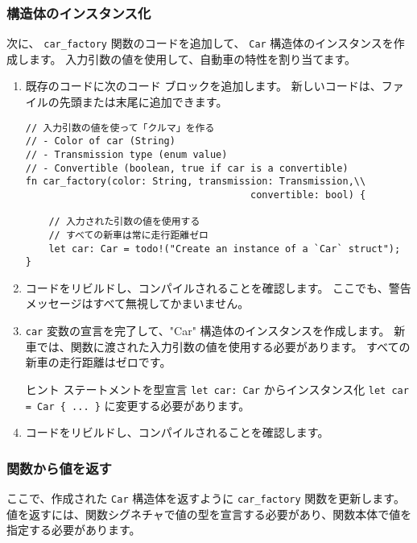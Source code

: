 \subsubsection{構造体のインスタンス化}

次に、 \texttt{car\_factory} 関数のコードを追加して、 \texttt{Car} 構造体のインスタンスを作成します。 入力引数の値を使用して、自動車の特性を割り当てます。

\begin{enumerate}
\item 既存のコードに次のコード ブロックを追加します。 新しいコードは、ファイルの先頭または末尾に追加できます。


\begin{lstlisting}[numbers=none]
// 入力引数の値を使って「クルマ」を作る
// - Color of car (String)
// - Transmission type (enum value)
// - Convertible (boolean, true if car is a convertible)
fn car_factory(color: String, transmission: Transmission,\\
                                       convertible: bool) {

    // 入力された引数の値を使用する
    // すべての新車は常に走行距離ゼロ
    let car: Car = todo!("Create an instance of a `Car` struct");
}
\end{lstlisting}

\item コードをリビルドし、コンパイルされることを確認します。 ここでも、警告メッセージはすべて無視してかまいません。

\item \texttt{car} 変数の宣言を完了して、"Car" 構造体のインスタンスを作成します。 新車では、関数に渡された入力引数の値を使用する必要があります。 すべての新車の走行距離はゼロです。

\begin{itembox}[l]{ヒント}
ステートメントを型宣言 \texttt{let car: Car} からインスタンス化 \texttt{let car = Car \{ ... \}} に変更する必要があります。
\end{itembox}

\item コードをリビルドし、コンパイルされることを確認します。
\end{enumerate}

\subsubsection{関数から値を返す}

ここで、作成された \texttt{Car} 構造体を返すように \texttt{car\_factory} 関数を更新します。 値を返すには、関数シグネチャで値の型を宣言する必要があり、関数本体で値を指定する必要があります。

